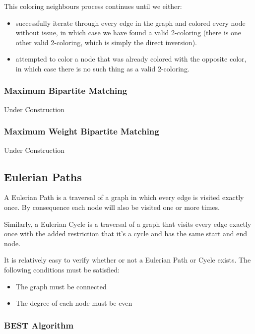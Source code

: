 This coloring neighbours process continues until we either:
\begin{itemize}
\item successfully iterate through every edge in the graph and colored every node without issue, in which case we have found a valid 2-coloring (there is one other valid 2-coloring, which is simply the direct inversion).
\item attempted to color a node that was already colored with the opposite color, in which case there is no such thing as a valid 2-coloring.
\end{itemize}

\subsubsection{Maximum Bipartite Matching}
 

Under Construction

\subsubsection{Maximum Weight Bipartite Matching}
  

Under Construction

\subsection{Eulerian Paths}
 

A Eulerian Path is a traversal of a graph in which every edge is visited exactly once. By consequence each node will also be visited one or more times.

Similarly, a Eulerian Cycle is a traversal of a graph that visits every edge exactly once with the added restriction that it's a cycle and has the same start and end node.

It is relatively easy to verify whether or not a Eulerian Path or Cycle exists. The following conditions must be satisfied:
\begin{itemize}
\item The graph must be connected
\item The degree of each node must be even
\end{itemize}

\subsubsection{BEST Algorithm}


